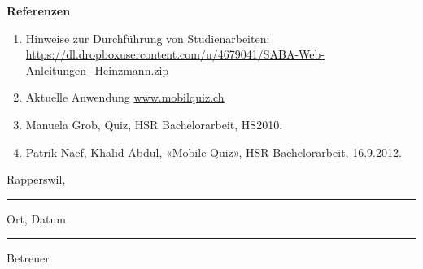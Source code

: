 \bigskip\bigskip
{\large \textbf{Referenzen}}
\begin{enumerate}
	  \item Hinweise zur Durchführung von Studienarbeiten: \url{https://dl.dropboxusercontent.com/u/4679041/SABA-Web-Anleitungen\_Heinzmann.zip}
	  \item Aktuelle Anwendung \url{www.mobilquiz.ch}  
	  \item Manuela Grob, Quiz, HSR Bachelorarbeit, HS2010.
	  \item Patrik Naef, Khalid Abdul, «Mobile Quiz», HSR Bachelorarbeit, 16.9.2012.
\end{enumerate}

\bigskip \bigskip
\parbox{6cm}{Rapperswil, \hrule
\strut \footnotesize Ort, Datum} \hfill
\parbox{5cm}{\hrule
\strut \footnotesize Betreuer}
